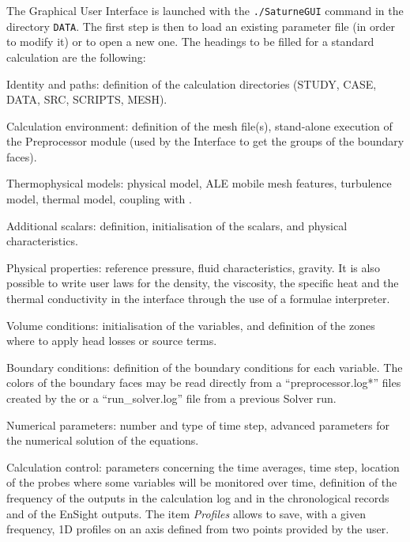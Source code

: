 {{{{The Graphical User Interface is launched with the \texttt{./SaturneGUI} command
in the directory \texttt{DATA}. The first step is
then to load an existing parameter file (in order to modify it) or to
open a new one. The headings to be filled for a standard calculation are the
following:

\begin{list}{-}{}
\item Identity and paths: definition of the calculation directories
      (STUDY, CASE, DATA, SRC, SCRIPTS, MESH).

\item Calculation environment: definition of the mesh file(s),
      stand-alone execution of the Preprocessor module
      (used by the Interface to get the groups of the boundary
      faces).

\item Thermophysical models: physical model, ALE mobile mesh features,
      turbulence model, thermal model, coupling with \syrthes.

\item Additional scalars: definition, initialisation of the scalars,
      and physical characteristics.

\item Physical properties: reference pressure, fluid characteristics, gravity.
      It is also possible to write user laws for the density, the viscosity,
      the specific heat and the thermal conductivity in the interface through
      the use of a formulae interpreter.

\item Volume conditions: initialisation of the variables, and definition of
      the zones where to apply head losses or source terms.

\item Boundary conditions: definition of the boundary conditions for
      each variable. The colors of the boundary faces may be read
      directly from a ``preprocessor.log*'' files created by the \pcs
      or a ``run\_solver.log'' file from a previous Solver run.

\item Numerical parameters: number and type of time step, advanced parameters
      for the numerical solution of the equations.

\item Calculation control: parameters concerning the time averages, time step,
      location of
      the probes where some variables will be monitored over time,
      definition of the frequency of the outputs in the calculation
      log and in the chronological records and of the EnSight outputs.
      The item {\itshape Profiles} allows to save, with a  given frequency,
      1D profiles on an axis defined from two points provided by the user.


\end{list}}}}}
